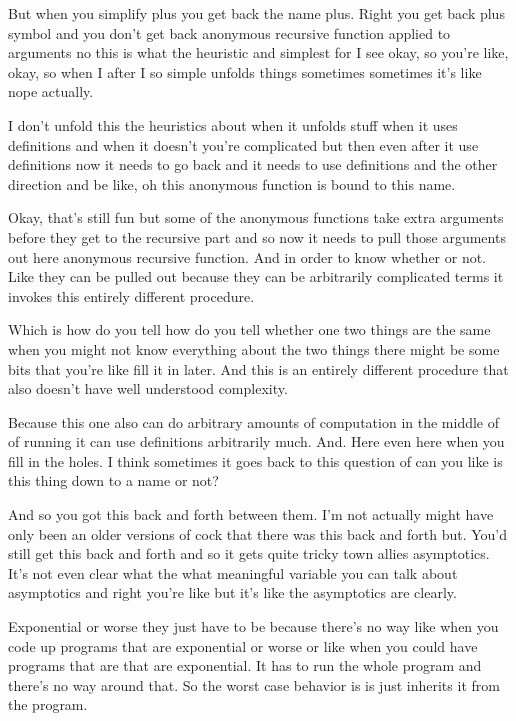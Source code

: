 \begin{subappendices}
    But when you simplify plus you get back the name plus. Right you get back plus symbol and you don't get back anonymous recursive function applied to arguments no this is what the heuristic and simplest for I see okay, so you're like, okay, so when I after I so simple unfolds things sometimes sometimes it's like nope actually. 
    
    I don't unfold this the heuristics about when it unfolds stuff when it uses definitions and when it doesn't you're complicated but then even after it use definitions now it needs to go back and it needs to use definitions and the other direction and be like, oh this anonymous function is bound to this name. 
    
    Okay, that's still fun but some of the anonymous functions take extra arguments before they get to the recursive part and so now it needs to pull those arguments out here anonymous recursive function. And in order to know whether or not. Like they can be pulled out because they can be arbitrarily complicated terms it invokes this entirely different procedure. 
    
    Which is how do you tell how do you tell whether one two things are the same when you might not know everything about the two things there might be some bits that you're like fill it in later. And this is an entirely different procedure that also doesn't have well understood complexity. 
    
    Because this one also can do arbitrary amounts of computation in the middle of of running it can use definitions arbitrarily much. And. Here even here when you fill in the holes. I think sometimes it goes back to this question of can you like is this thing down to a name or not? 
    
    And so you got this back and forth between them. I'm not actually might have only been an older versions of cock that there was this back and forth but. You'd still get this back and forth and so it gets quite tricky town allies asymptotics. It's not even clear what the what meaningful variable you can talk about asymptotics and right you're like but it's like the asymptotics are clearly. 
    
    Exponential or worse they just have to be because there's no way like when you code up programs that are exponential or worse or like when you could have programs that are that are exponential. It has to run the whole program and there's no way around that. So the worst case behavior is is just inherits it from the program. 
    

\end{subappendices}
